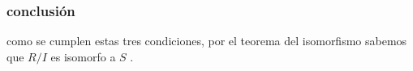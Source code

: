 \documentclass[10pt,a4paper]{article} %
\begin{document}
            \subsubsection{conclusión}
                como se cumplen estas tres condiciones, por el teorema del
                isomorfismo sabemos que $ R/I   $ es isomorfo a $ S  $  .



















    \nocite{*}
    
    
\end{document}
